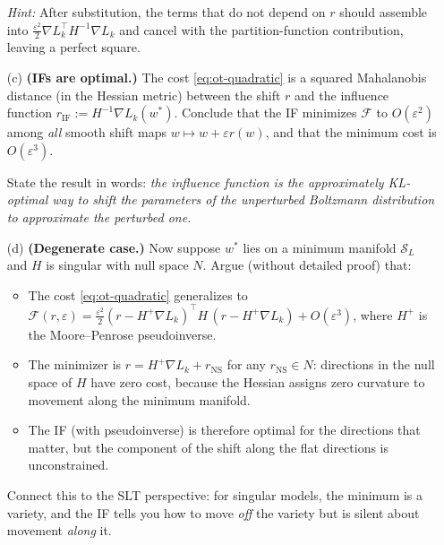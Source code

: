 \documentclass[11pt]{article}
\begin{document}
\begin{exercise}
\begin{enumerate}
  \emph{Hint:} After substitution, the terms that do not depend on $r$ should assemble into $\tfrac{\varepsilon^2}{2}\nabla L_k^\top H^{-1}\nabla L_k$ and cancel with the partition-function contribution, leaving a perfect square.

  \item[(c)] \textbf{(IFs are optimal.)} The cost \eqref{eq:ot-quadratic} is a squared Mahalanobis distance (in the Hessian metric) between the shift $r$ and the influence function $r_{\mathrm{IF}} := H^{-1}\nabla L_k(w^*)$. Conclude that the IF minimizes $\mathcal{F}$ to $O(\varepsilon^2)$ among \emph{all} smooth shift maps $w\mapsto w+\varepsilon r(w)$, and that the minimum cost is $O(\varepsilon^3)$.

  State the result in words: \emph{the influence function is the approximately KL-optimal way to shift the parameters of the unperturbed Boltzmann distribution to approximate the perturbed one.}

  \item[(d)] \textbf{(Degenerate case.)} Now suppose $w^*$ lies on a minimum manifold $\mathcal{S}_L$ and $H$ is singular with null space $N$. Argue (without detailed proof) that:
  \begin{itemize}
    \item The cost \eqref{eq:ot-quadratic} generalizes to $\mathcal{F}(r,\varepsilon) = \tfrac{\varepsilon^2}{2}(r - H^+\nabla L_k)^\top H\,(r - H^+\nabla L_k) + O(\varepsilon^3)$, where $H^+$ is the Moore--Penrose pseudoinverse.
    \item The minimizer is $r = H^+\nabla L_k + r_{\mathrm{NS}}$ for any $r_{\mathrm{NS}}\in N$: directions in the null space of $H$ have zero cost, because the Hessian assigns zero curvature to movement along the minimum manifold.
    \item The IF (with pseudoinverse) is therefore optimal for the directions that matter, but the component of the shift along the flat directions is unconstrained.
  \end{itemize}
  Connect this to the SLT perspective: for singular models, the minimum is a variety, and the IF tells you how to move \emph{off} the variety but is silent about movement \emph{along} it.


\end{enumerate}
\end{exercise}
\end{document}
